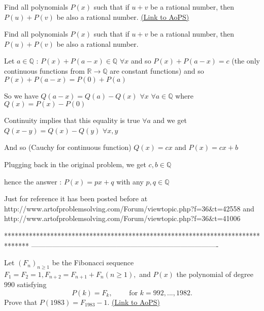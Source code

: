 \begin{problem}
	Find all polynomials $P(x)$ such that if $u+v$ be a rational number, then $P(u)+P(v)$ be also a rational number.
	\flushright \href{https://artofproblemsolving.com/community/c6h363202}{(Link to AoPS)}
\end{problem}



\begin{solution}
	\begin{tcolorbox}Find all polynomials $P(x)$ such that if $u+v$ be a rational number, then $P(u)+P(v)$ be also a rational number.\end{tcolorbox}

Let $a\in\mathbb Q$ : $P(x)+P(a-x)\in\mathbb Q$ $\forall x$ and so $P(x)+P(a-x)=c$ (the only continuous functions from $\mathbb R\to\mathbb Q$ are constant functions) and so $P(x)+P(a-x)=P(0)+P(a)$

So we have $Q(a-x)=Q(a)-Q(x)$ $\forall x$ $\forall a\in\mathbb Q$ where $Q(x)=P(x)-P(0)$

Continuity implies that this equality is true $\forall a$ and we get $Q(x-y)=Q(x)-Q(y)$ $\forall x,y$ 

And so (Cauchy for continuous function) $Q(x)=cx$ and $P(x)=cx+b$

Plugging back in the original problem, we get $c,b\in\mathbb Q$

hence the answer : $P(x)=px+q$ with any $p,q\in\mathbb Q$
\end{solution}



\begin{solution}
	Just for reference it has been posted before at http://www.artofproblemsolving.com/Forum/viewtopic.php?f=36&t=42558 and http://www.artofproblemsolving.com/Forum/viewtopic.php?f=36&t=41006
\end{solution}
*******************************************************************************
-------------------------------------------------------------------------------

\begin{problem}
	Let $(F_n)_{n\geq 1} $ be the Fibonacci sequence $F_1 = F_2 = 1, F_{n+2} = F_{n+1} + F_n (n \geq 1),$ and $P(x)$ the polynomial of degree $990$ satisfying
\[ P(k) = F_k, \qquad \text{ for } k = 992, . . . , 1982.\]
Prove that $P(1983) = F_{1983} - 1.$
	\flushright \href{https://artofproblemsolving.com/community/c6h366075}{(Link to AoPS)}
\end{problem}




